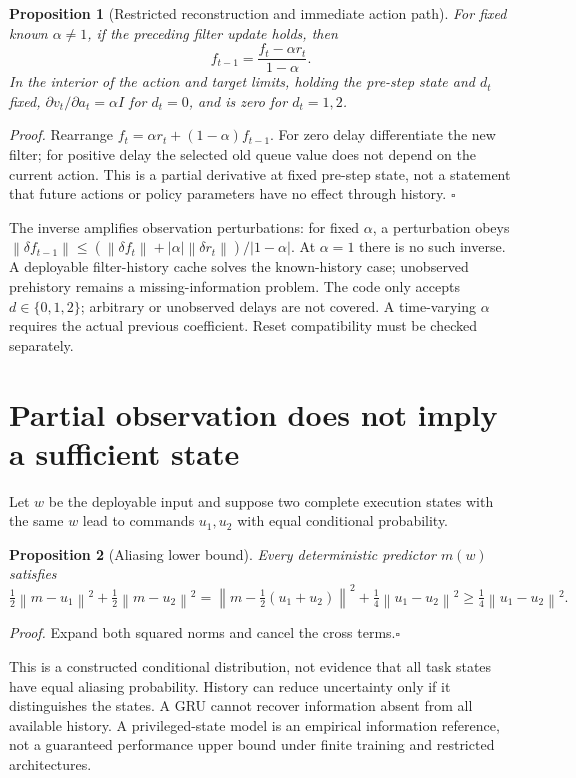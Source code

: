 \documentclass[10pt]{article}
\newtheorem{proposition}{Proposition}
\newenvironment{proof}{\par\noindent\textit{Proof.} }{\hfill$\square$\par}
\newcommand{\norm}[1]{\left\|#1\right\|}
\begin{document}
\begin{proposition}[Restricted reconstruction and immediate action path]
For fixed known $\alpha\ne1$, if the preceding filter update holds, then
\begin{equation}
f_{t-1}=\frac{f_t-\alpha r_t}{1-\alpha}.
\end{equation}
In the interior of the action and target limits, holding the pre-step state and $d_t$ fixed, $\partial v_t/\partial a_t=\alpha I$ for $d_t=0$, and is zero for $d_t=1,2$.
\end{proposition}
\begin{proof}
Rearrange $f_t=\alpha r_t+(1-\alpha)f_{t-1}$. For zero delay differentiate the new filter; for positive delay the selected old queue value does not depend on the current action. This is a partial derivative at fixed pre-step state, not a statement that future actions or policy parameters have no effect through history.
\end{proof}
The inverse amplifies observation perturbations: for fixed $\alpha$, a perturbation obeys
$\norm{\delta f_{t-1}}\le(\norm{\delta f_t}+|\alpha|\norm{\delta r_t})/|1-\alpha|$.
At $\alpha=1$ there is no such inverse. A deployable filter-history cache solves the known-history case; unobserved prehistory remains a missing-information problem. The code only accepts $d\in\{0,1,2\}$; arbitrary or unobserved delays are not covered. A time-varying $\alpha$ requires the actual previous coefficient. Reset compatibility must be checked separately.

\section{Partial observation does not imply a sufficient state}
Let $w$ be the deployable input and suppose two complete execution states with the same $w$ lead to commands $u_1,u_2$ with equal conditional probability.
\begin{proposition}[Aliasing lower bound]
Every deterministic predictor $m(w)$ satisfies
\begin{equation}
\tfrac12\norm{m-u_1}^2+\tfrac12\norm{m-u_2}^2
=\norm{m-\tfrac12(u_1+u_2)}^2+\tfrac14\norm{u_1-u_2}^2
\ge\tfrac14\norm{u_1-u_2}^2.
\end{equation}
\end{proposition}
\begin{proof}Expand both squared norms and cancel the cross terms.\end{proof}
This is a constructed conditional distribution, not evidence that all task states have equal aliasing probability. History can reduce uncertainty only if it distinguishes the states. A GRU cannot recover information absent from all available history. A privileged-state model is an empirical information reference, not a guaranteed performance upper bound under finite training and restricted architectures.
\end{document}
